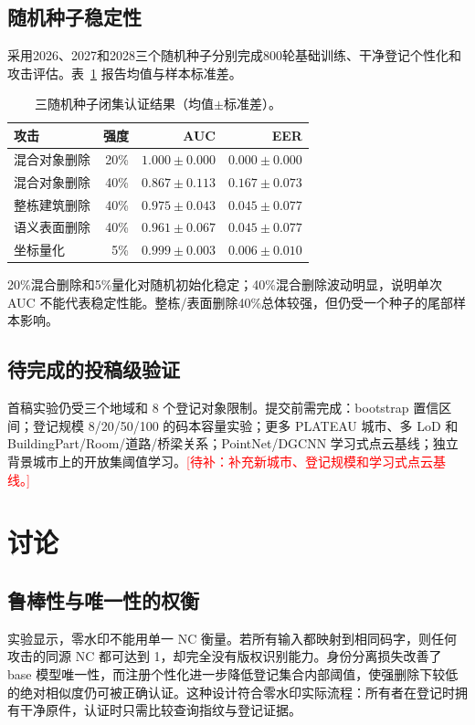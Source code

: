 \documentclass[UTF8,fontset=fandol,12pt]{ctexart}
\newcommand{\todo}[1]{\textcolor{red}{[待补：#1]}}
\begin{document}
\subsection{随机种子稳定性}
采用2026、2027和2028三个随机种子分别完成800轮基础训练、干净登记个性化和攻击评估。表~\ref{tab:seeds} 报告均值与样本标准差。
\begin{table}[H]\centering
\caption{三随机种子闭集认证结果（均值$\pm$标准差）。}\label{tab:seeds}
\begin{tabular}{lrrr}
\toprule 攻击 & 强度 & AUC & EER\\
\midrule 混合对象删除 & 20\% & $1.000\pm0.000$ & $0.000\pm0.000$\\
混合对象删除 & 40\% & $0.867\pm0.113$ & $0.167\pm0.073$\\
整栋建筑删除 & 40\% & $0.975\pm0.043$ & $0.045\pm0.077$\\
语义表面删除 & 40\% & $0.961\pm0.067$ & $0.045\pm0.077$\\
坐标量化 & 5\% & $0.999\pm0.003$ & $0.006\pm0.010$\\
\bottomrule
\end{tabular}
\end{table}
20\%混合删除和5\%量化对随机初始化稳定；40\%混合删除波动明显，说明单次 AUC 不能代表稳定性能。整栋/表面删除40\%总体较强，但仍受一个种子的尾部样本影响。

\subsection{待完成的投稿级验证}
首稿实验仍受三个地域和 8 个登记对象限制。提交前需完成：bootstrap 置信区间；登记规模 8/20/50/100 的码本容量实验；更多 PLATEAU 城市、多 LoD 和 BuildingPart/Room/道路/桥梁关系；PointNet/DGCNN 学习式点云基线；独立背景城市上的开放集阈值学习。\todo{补充新城市、登记规模和学习式点云基线。}

\section{讨论}
\subsection{鲁棒性与唯一性的权衡}
实验显示，零水印不能用单一 NC 衡量。若所有输入都映射到相同码字，则任何攻击的同源 NC 都可达到 1，却完全没有版权识别能力。身份分离损失改善了 base 模型唯一性，而注册个性化进一步降低登记集合内部阈值，使强删除下较低的绝对相似度仍可被正确认证。这种设计符合零水印实际流程：所有者在登记时拥有干净原件，认证时只需比较查询指纹与登记证据。
\end{document}
